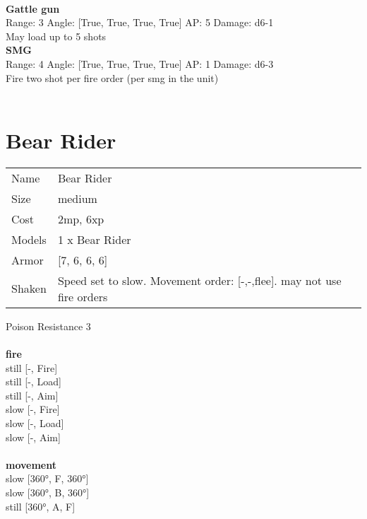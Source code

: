 \ \\
{\bf Gattle gun } \\



Range: 3  Angle: [True, True, True, True] AP: 5 Damage: d6-1 \\
May load up to 5 shots\\ 




{\bf SMG } \\



Range: 4  Angle: [True, True, True, True] AP: 1 Damage: d6-3 \\
Fire two shot per fire order (per smg in the unit)\\ 




 
\ \\













\clearpage

\section{ Bear Rider }

\begin{tabular}{ll}
  Name & Bear Rider \\
  Size & medium\\
  Cost & 2mp, 6xp\\
  Models & 1 x Bear Rider\\
  Armor & [7, 6, 6, 6]\\
  Shaken & Speed set to slow. Movement order: [-,-,flee]. may not use fire orders\\
\end{tabular}

\noindent Poison Resistance 3\\ 


\ \\ {\bf fire } \\
still [-, Fire] \\
still [-, Load] \\
still [-, Aim] \\
slow [-, Fire] \\
slow [-, Load] \\
slow [-, Aim] \\
\ \\ {\bf movement } \\
slow [360°, F, 360°] \\
slow [360°, B, 360°] \\
still [360°, A, F] \\


